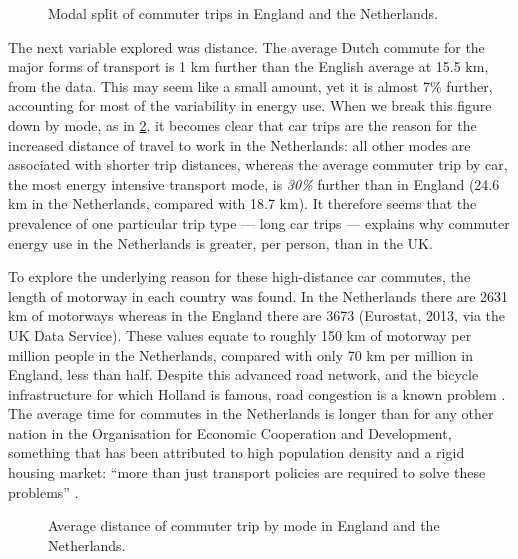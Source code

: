 \begin{figure}
 \caption[Modal split of commuter trips in England and the Netherlands]
 {Modal split of commuter trips in England and the
Netherlands.}\label{fdutchmode}
\end{figure}

The next variable explored was distance. The average Dutch
commute for the major forms of transport %
is 1 km further than the English average at 15.5 km, from the data.
This may seem like a small amount, yet it is almost 7\% further, accounting for
most of the variability in energy use. When we
break this figure down by mode, as in \cref{favdistnl}, it becomes clear that
car trips are the reason for the increased distance of travel to work
in the Netherlands: all other modes are associated with shorter trip distances,
whereas the average commuter trip by car, the most energy intensive transport
mode, is \emph{30\%} further than in England (24.6 km in
the Netherlands, compared with 18.7 km). It therefore seems that
the prevalence of one particular trip type --- long car trips --- explains why
commuter energy use in the Netherlands is greater, per person, than in the UK.

To explore the underlying reason for these high-distance car commutes,
the length of motorway in each country was found. In the Netherlands
there are 2631 km of motorways whereas in the
England there are 3673 (Eurostat, 2013, via the UK Data Service). These
values equate to roughly 150 km of motorway per million people in the Netherlands,
compared with only 70 km per million in England, less than half. Despite this
advanced road network, and the bicycle infrastructure for which Holland is
famous, road congestion is a known problem \citep{OECD2010}. The average time for commutes
in the Netherlands is longer than for any other nation in the Organisation for
Economic Cooperation and Development, something that has been attributed to
high population density and a rigid housing market: ``more than just transport
policies are required to solve these problems'' \citep[p.~8]{OECD2010}.

\begin{figure}
 \caption[Distance of commuting by mode, England and the Netherlands]
 {Average distance of commuter trip by mode in England and the
Netherlands.}\label{favdistnl}
\end{figure}

